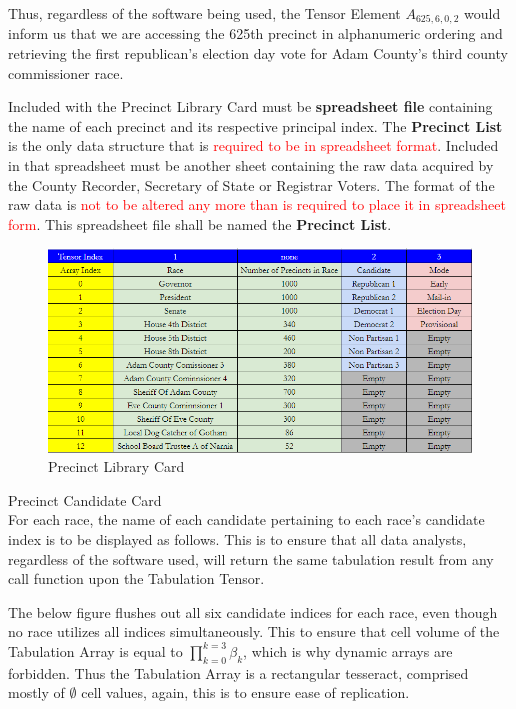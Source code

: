 Thus, regardless of the software being used, the Tensor Element $A_{625,6,0,2}$ would inform us that we are accessing the 625th precinct in alphanumeric ordering and retrieving the first republican's election day vote for Adam County's third county commissioner race.

Included with the Precinct Library Card must be \textbf{spreadsheet file} containing the name of each precinct and its respective principal index. The \textbf{Precinct List} is the only data structure that is \textcolor{red}{required to be in spreadsheet format}. Included in that spreadsheet must be another sheet containing the raw data acquired by the County Recorder, Secretary of State or Registrar Voters. The format of the raw data is \textcolor{red}{not to be altered any more than is required to place it in spreadsheet form}. This spreadsheet file shall be named the \textbf{Precinct List}.
\begin{figure}[bp!]
\begin{center}
\caption{Precinct Library Card}
\includegraphics[width=400pt]{Precinct Library Card.png}
\end{center}
\end{figure}
\newpage
\begin{definition}{Precinct Candidate Card}\\
For each race, the name of each candidate pertaining to each race's candidate index is to be displayed as follows. This is to ensure that all data analysts, regardless of the software used, will return the same tabulation result from any call function upon the Tabulation Tensor.
\end{definition}

The below figure flushes out all six candidate indices for each race, even though no race utilizes all indices simultaneously. This to ensure that cell volume of the Tabulation Array is equal to $\prod_{k=0}^{k=3} \beta_{k}$, which is why dynamic arrays are forbidden. Thus the Tabulation Array is a rectangular tesseract, comprised mostly of $\emptyset$ cell values, again, this is to ensure ease of replication.

